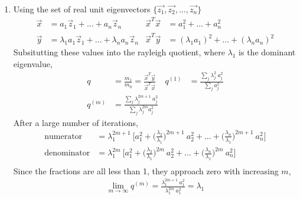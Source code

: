 \begin{enumerate}
    \item Using the set of real unit eigenvectors
          $ \{\vec{z_1},\vec{z_2},\dots,\vec{z_n}\} $
          \begin{align}
              \vec{x}                  & = a_1\vec{z}_1 + \dots + a_n\vec{z}_n &
              \vec{x}^T \vec{x}        & = a_1^2 + \dots + a_n^2                 \\
              \vec{y}                  & = \lambda_1 a_1 \vec{z}_1 + \dots
              + \lambda_n a_n\vec{z}_n &
              \vec{x}^T \vec{y}        & = (\lambda_1 a_1)^2 + \dots
              + (\lambda_n a_n)^2
          \end{align}
          Subsitutting these values into the rayleigh quotient, where $ \lambda_1 $ is
          the dominant eigenvalue,
          \begin{align}
              q       & = \frac{m_1}{m_0} = \frac{\vec{x}^T \vec{y}}
              {\vec{x}^T \vec{x}}
                      &
              q^{(1)} & = \frac{\sum_{j} \lambda_j^2\ a_j^2}{\sum_{j} a_j^2} \\
              q^{(m)} & = \frac{\sum_{j} \lambda_j^{2m+1}\ a_j^2}
              {\sum_{j} \lambda_j^{2m} a_j^{2}}
          \end{align}
          After a large number of iterations,
          \begin{align}
              \text{numerator}   & = \lambda_1^{2m+1}\ \Bigg[ a_1^2
                  + \Bigg( \frac{\lambda_2}{\lambda_1} \Bigg)^{2m+1}\ a_2^2
                  + \dots
              + \Bigg( \frac{\lambda_n}{\lambda_1} \Bigg)^{2m+1}\ a_n^2 \Bigg] \\
              \text{denominator} & = \lambda_1^{2m}\ \Bigg[ a_1^2
                  + \Bigg( \frac{\lambda_2}{\lambda_1} \Bigg)^{2m}\ a_2^2
                  + \dots
              + \Bigg( \frac{\lambda_n}{\lambda_1} \Bigg)^{2m}\ a_n^2 \Bigg]   \\
          \end{align}
          Since the fractions are all less than 1, they approach zero with increasing
          $ m $,
          \begin{align}
              \lim_{m \to \infty} q^{(m)} = \frac{\lambda_1^{2m+1}\ a_1^2}
              {\lambda_1^{2m}\ a_1^2} = \lambda_1
          \end{align}


\end{enumerate}
